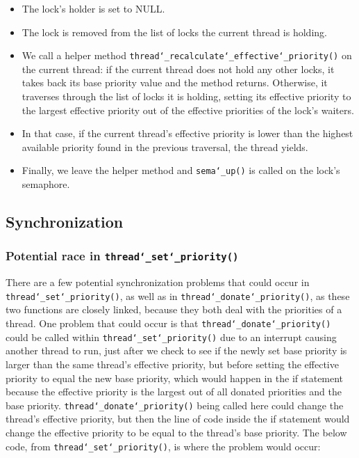 \documentclass{article}
\renewcommand{\_}{\char`_}
\begin{document}
\begin{itemize}

\item The lock's holder is set to NULL.

\item The lock is removed from the list of locks the current thread is holding.

\item We call a helper method \texttt{thread\_recalculate\_effective\_priority()} on the current thread: if the current thread does not hold any other locks, it takes back its base priority value and the method returns. Otherwise, it traverses through the list of locks it is holding, setting its effective priority to the largest effective priority out of the effective priorities of the lock's waiters.

\item In that case, if the current thread's effective priority is lower than the highest available priority found in the previous traversal, the thread yields.

\item Finally, we leave the helper method and \texttt{sema\_up()} is called on the lock's semaphore.

\end{itemize}

\subsection{Synchronization}
\subsubsection{Potential race in \texttt{thread\_set\_priority()}}

There are a few potential synchronization problems that could occur in \texttt{thread\_set\_priority()}, as well as in \texttt{thread\_donate\_priority()}, as these two functions are closely linked, because they both deal with the priorities of a thread. One problem that could occur is that \texttt{thread\_donate\_priority()} could be called within \texttt{thread\_set\_priority()} due to an interrupt causing another thread to run, just after we check to see if the newly set base priority is larger than the same thread's effective priority, but before setting the effective priority to equal the new base priority, which would happen in the if statement because the effective priority is the largest out of all donated priorities and the base priority. \texttt{thread\_donate\_priority()} being called here could change the thread's effective priority, but then the line of code inside the if statement would change the effective priority to be equal to the thread's base priority. The below code, from \texttt{thread\_set\_priority()}, is where the problem would occur:
\end{document}

